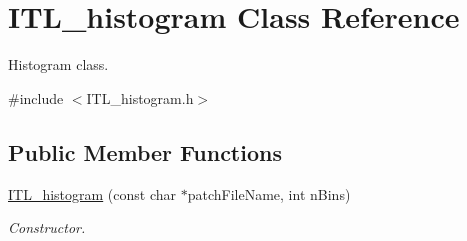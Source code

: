 \hypertarget{classITL__histogram}{
\section{ITL\_\-histogram Class Reference}
\label{classITL__histogram}
}


Histogram class.  




{\ttfamily \#include $<$ITL\_\-histogram.h$>$}

\subsection*{Public Member Functions}
\begin{DoxyCompactItemize}
\item 
\hyperlink{classITL__histogram_a5bbbc427af2d4b960be619fd34b7d272}{ITL\_\-histogram} (const char $\ast$patchFileName, int nBins)
\begin{DoxyCompactList}\small\item\em Constructor. \item\end{DoxyCompactList}\end{DoxyCompactItemize}
